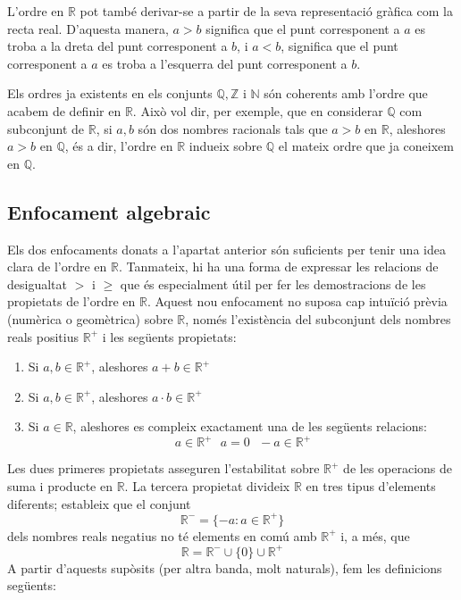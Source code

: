 L’ordre en $\mathbb{R}$ pot també derivar-se a partir de la seva
representació gràfica com la recta real. D’aquesta manera, $a>b$
significa que el punt corresponent a $a$ es troba a la dreta del punt
corresponent a $b$, i $a<b$, significa que el punt corresponent a $a$
es troba a l’esquerra del punt corresponent a $b$.

Els ordres ja existents en els conjunts $\mathbb{Q},\mathbb{Z}$ i $%
\mathbb{N}$ són coherents amb l’ordre que acabem de definir en $%
\mathbb{R}$. Això vol dir, per exemple, que en considerar $\mathbb{Q}$
com subconjunt de $\mathbb{R}$, si $a,b$ són dos nombres racionals
tals que $a>b$ en $\mathbb{R}$, aleshores $a>b$ en $\mathbb{Q}$, és a dir,
l’ordre en $\mathbb{R}$ indueix sobre $\mathbb{Q}$ el mateix ordre que ja
coneixem en $\mathbb{Q}$.

\subsection{Enfocament algebraic}

Els dos enfocaments donats a l’apartat anterior són suficients per tenir
una idea clara de l’ordre en $\mathbb{R}$. Tanmateix, hi ha una forma de
expressar les relacions de desigualtat $>$ i $\geq$ que és especialment 
útil per fer les demostracions de les propietats de l’ordre en $%
\mathbb{R}$. Aquest nou enfocament no suposa cap intuïció prèvia (numèrica o geomètrica) sobre $\mathbb{R}$, només l’existència del
subconjunt dels nombres reals positius $\mathbb{R}^{+}$ i les
següents propietats:

\begin{enumerate}
\item Si $a,b\in \mathbb{R}^{+}$, aleshores $a+b\in \mathbb{R}^{+}$

\item Si $a,b\in \mathbb{R}^{+}$, aleshores $a\cdot b\in \mathbb{R}^{+}$

\item Si $a\in \mathbb{R}$, aleshores es compleix exactament una de les
següents relacions:%
\begin{equation*}
a\in \mathbb{R}^{+}\text{ \ \ \ \ \ \ }a=0\text{ \ \ \ \ \ \ }-a\in \mathbb{R%
}^{+}
\end{equation*}
\end{enumerate}

Les dues primeres propietats asseguren l’estabilitat sobre $\mathbb{R}^{+}$
de les operacions de suma i producte en $\mathbb{R}$. La tercera propietat
divideix $\mathbb{R}$ en tres tipus d’elements diferents; estableix que el
conjunt 
\begin{equation*}
\mathbb{R}^{-}=\{-a:a\in \mathbb{R}^{+}\}
\end{equation*}%
dels nombres reals negatius no té elements en comú amb $%
\mathbb{R}^{+}$ i, a més, que 
\begin{equation*}
\mathbb{R}=\mathbb{R}^{-}\cup \{0\}\cup \mathbb{R}^{+}
\end{equation*}%
A partir d’aquests supòsits (per altra banda, molt naturals), fem les
definicions següents:

